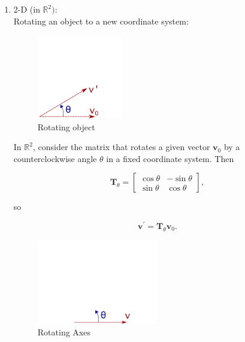 \documentclass[10pt,b5paper,titlepage]{book}
\begin{document}
\begin{enumerate}
    \item 2-D (in $\mathbb{R}^{2})$:\\
        Rotating an object to a new coordinate system:

        \begin{figure}[h]
            \centering
            \includegraphics[width=0.35\textwidth]{img/RotationMatrix_1000}
            \caption{Rotating object}
            \label{fig:RotationMatrix_1000-png}
        \end{figure}

        In $\mathbb{R}^{2}$, consider the matrix that rotates a given
        vector $\mathbf{v}_{0}$ by a counterclockwise angle $\theta$ in
        a fixed coordinate system. Then

        \begin{equation}
            \mathbf{T}_{\theta} = \begin{bmatrix}
                \cos \theta & -\sin \theta \\
                \sin \theta & \cos \theta
            \end{bmatrix}
        ,\end{equation}

        so

        \begin{equation}
            \mathbf{v}^{'} = \mathbf{T}_{\theta}\mathbf{v}_{0}
        .\end{equation}

        \begin{figure}[h]
            \centering
            \includegraphics[width=0.5\textwidth]{img/RotationMatrixAxes_1000}
            \caption{Rotating Axes}
            \label{fig:RotationMatrixAxes_1000-png}
        \end{figure}


\end{enumerate}
\end{document}
